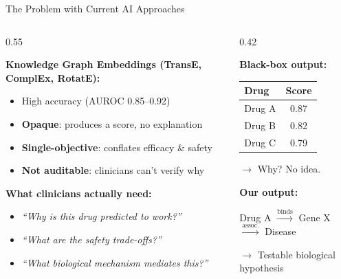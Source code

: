 \documentclass[aspectratio=169,11pt]{beamer}
\begin{document}
\begin{frame}{The Problem with Current AI Approaches}

\begin{columns}[T]
\begin{column}{0.55\textwidth}

\textbf{Knowledge Graph Embeddings (TransE, ComplEx, RotatE):}

\begin{itemize}
    \item[\textcolor{pillgreen}{\checkmark}] High accuracy (AUROC 0.85--0.92)
    \item[\textcolor{pillred}{\bfseries $\times$}] \textbf{Opaque}: produces a score, no explanation
    \item[\textcolor{pillred}{\bfseries $\times$}] \textbf{Single-objective}: conflates efficacy \& safety
    \item[\textcolor{pillred}{\bfseries $\times$}] \textbf{Not auditable}: clinicians can't verify why
\end{itemize}

\vspace{1em}

\textbf{What clinicians actually need:}
\begin{itemize}
    \item \emph{``Why is this drug predicted to work?''}
    \item \emph{``What are the safety trade-offs?''}
    \item \emph{``What biological mechanism mediates this?''}
\end{itemize}

\end{column}

\begin{column}{0.42\textwidth}
\centering

\textbf{Black-box output:}

\medskip

\begin{tabular}{lc}
\toprule
Drug & Score \\
\midrule
Drug A & 0.87 \\
Drug B & 0.82 \\
Drug C & 0.79 \\
\bottomrule
\end{tabular}

\vspace{0.5em}
{\small \textcolor{pillred}{$\to$ Why? No idea.}}

\vspace{1.5em}

\textbf{Our output:}

\medskip

{\small Drug A $\xrightarrow{\text{binds}}$ Gene X $\xrightarrow{\text{assoc.}}$ Disease}

\vspace{0.5em}
{\small \textcolor{pillgreen}{$\to$ Testable biological hypothesis}}

\end{column}
\end{columns}

\end{frame}
\end{document}

